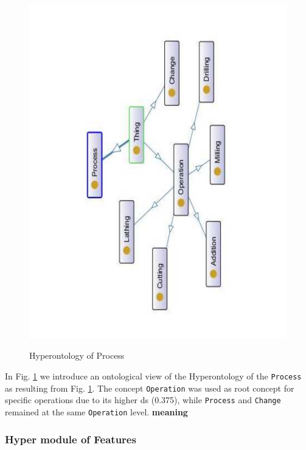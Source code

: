 \begin{figure}
\begin{center}
	\includegraphics[scale=0.5, angle=270]{figure-chapterIV/fig4-21}\\
	\vspace{-40mm}
	\caption{Hyperontology of Process}
	
	\label{figure4-21}
\end{center}
\end{figure}

In Fig. \ref{figure4-21} we introduce an ontological view of the Hyperontology of the \texttt{Process} as resulting from Fig. \ref{figure4-21}. The concept \texttt{Operation} was used as root concept for specific operations due to its higher \gls{ds} (0.375), while \texttt{Process} and \texttt{Change} remained  at the same \texttt{Operation} level. \textbf{meaning}

\subsubsection{Hyper module of Features}\label{subsubsection4.2.5.4}


